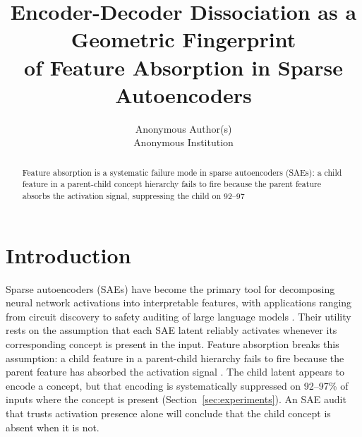 \documentclass{article}
\title{Encoder-Decoder Dissociation as a Geometric Fingerprint\\
of Feature Absorption in Sparse Autoencoders}
\author{
  Anonymous Author(s)\\
  Anonymous Institution
}
\begin{document}
\maketitle



\begin{abstract}
Feature absorption is a systematic failure mode in sparse autoencoders (SAEs): a child feature in a parent-child concept hierarchy fails to fire because the parent feature absorbs the activation signal, suppressing the child on 92–97%
\end{abstract}

\section{Introduction}

Sparse autoencoders (SAEs) have become the primary tool for decomposing neural network
activations into interpretable features, with applications ranging from circuit discovery
to safety auditing of large language models
\cite{bricken2023monosemanticity, conmy2023towards, anthropic2024scaling}.
Their utility rests on the assumption that each SAE latent reliably activates whenever its
corresponding concept is present in the input. Feature absorption breaks this assumption:
a child feature in a parent-child hierarchy fails to fire because the parent feature has
absorbed the activation signal \cite{chanin2024absorption}. The child latent appears to
encode a concept, but that encoding is systematically suppressed on 92–97\% of inputs where
the concept is present (Section~\ref{sec:experiments}). An SAE audit that trusts activation
presence alone will conclude that the child concept is absent when it is not.
\end{document}

